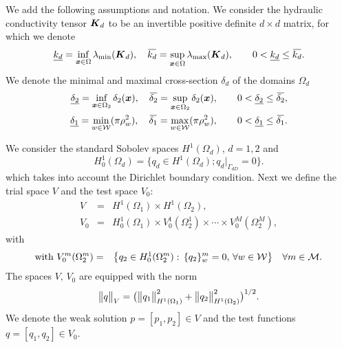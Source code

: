 We add the following assumptions and notation. We consider the hydraulic conductivity tensor $\mathbf{\boldsymbol{K}}_d$
to be an invertible positive definite $d\times d$ matrix, for which we denote
\begin{equation}
    \underline{k_d} = \inf\limits_{\bx\in\Omega}\lambda_{\min}(\vc K_d), \quad
    \overbar{k_d}   = \sup\limits_{\bx\in\Omega}\lambda_{\max}(\vc K_d), \qquad
     0 < \underline{k_d} \leq \overbar{k_d}.
\end{equation}
We denote the minimal and maximal cross-section $\delta_d$ of the domains $\Omega_d$
\begin{eqnarray}
    \underline{\delta_2} = \inf\limits_{\bx\in\Omega_2} \delta_2(\vc x), \quad
    \overbar{\delta_2}   = \sup\limits_{\bx\in\Omega_2} \delta_2(\vc x), \qquad
     0 < \underline{\delta_2} \leq \overbar{\delta_2},\\
     \underline{\delta_1} = \min\limits_{w\in\mathcal{W}} (\pi\rho_w^2), \quad
    \overbar{\delta_1}    = \max\limits_{w\in\mathcal{W}} (\pi\rho_w^2), \qquad
     0 < \underline{\delta_1} \leq \overbar{\delta_1}.
\end{eqnarray}

We consider the standard Sobolev spaces $H^1(\Omega_d)$, $d=1,2$ and
\[ H^1_0(\Omega_d)=\big\{q_d\in H^1(\Omega_d); q_d|_{\Gamma_{dD}}=0\big\}.
\]
which takes into account the Dirichlet boundary condition.
Next we define the trial space $V$ and the test space $V_0$:
\begin{eqnarray}
  V &=& H^1(\Omega_1)\times H^1(\Omega_2), \label{eqn:prim_weak_space_V}\\
  V_0 &=& H^1_0(\Omega_1)\times V^1_0(\Omega^1_2) \times\cdots\times V^M_0(\Omega^M_2), \label{eqn:prim_weak_space_V0}
\end{eqnarray}
with
\begin{eqnarray}
  \textrm{with } V^m_0(\Omega^m_2) &=& \big\{q_2\in H^1_0(\Omega^m_2):\, \{q_2\}^m_w=0,\,\forall w\in\mathcal{W}\big\}
  \quad \forall m\in\mathcal{M}. \label{eqn:prim_weak_space_Vm0}
\end{eqnarray}
%
The spaces $V,\,V_0$ are equipped with the norm
\begin{equation}
    \bigl\Vert q\bigr\Vert_V = \big( \bigl\Vert q_1\bigr\Vert^2_{H^1(\Omega_1)} + \bigl\Vert q_2\bigr\Vert^2_{H^1(\Omega_2)} \big)^{1/2}.
\end{equation}
We denote the weak solution $p=[p_1,p_2]\in V$ and the test functions $q=[q_1,q_2]\in V_0$.


